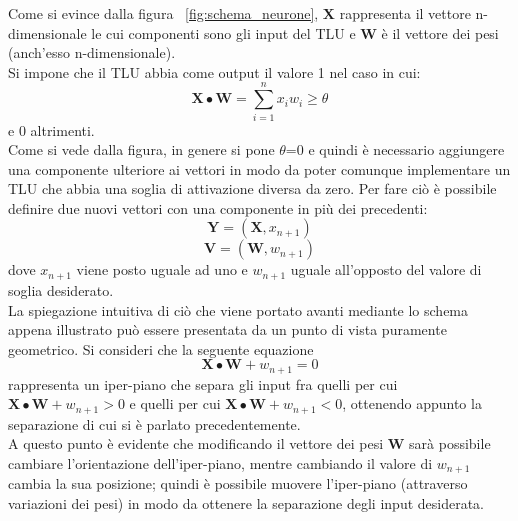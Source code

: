 Come si evince dalla figura ~\ref{fig:schema_neurone}, $\textbf{X}$ rappresenta il vettore n-dimensionale le cui componenti sono gli input del TLU e $\textbf{W}$ è il vettore dei pesi (anch'esso n-dimensionale). \\
Si impone che il TLU abbia come output il valore 1 nel caso in cui:
\begin{equation}
\textbf{X}\bullet\textbf{W} = \sum_{i=1}^{n} x_iw_i \ge \theta
\end{equation}  
e 0 altrimenti. \\
Come si vede dalla figura, in genere si pone $\theta$=0 e quindi è necessario aggiungere una componente ulteriore ai vettori in modo da poter comunque implementare un TLU che abbia una soglia di attivazione diversa da zero. Per fare ciò è possibile definire due nuovi vettori con una componente in più dei precedenti:
\begin{equation}
	\textbf{Y} = (\textbf{X},x_{n+1})
\end{equation}
\begin{equation}
	\textbf{V} = (\textbf{W},w_{n+1})
\end{equation}
dove $x_{n+1}$ viene posto uguale ad uno e $w_{n+1}$ uguale all'opposto del valore di soglia desiderato. \\
La spiegazione intuitiva di ciò che viene portato avanti mediante lo schema appena illustrato può essere presentata da un punto di vista puramente geometrico. Si consideri che la seguente equazione
\begin{equation}
	\textbf{X}\bullet\textbf{W} + w_{n+1} = 0
\end{equation}
rappresenta un iper-piano che separa gli input fra quelli per cui $\textbf{X}\bullet\textbf{W} + w_{n+1} > 0$ e quelli per cui $\textbf{X}\bullet\textbf{W} + w_{n+1} < 0$, ottenendo appunto la separazione di cui si è parlato precedentemente. \\
A questo punto è evidente che modificando il vettore dei pesi $\textbf{W}$ sarà possibile cambiare l'orientazione dell'iper-piano, mentre cambiando il valore di $w_{n+1}$ cambia la sua posizione; quindi è possibile muovere l'iper-piano (attraverso variazioni dei pesi) in modo da ottenere la separazione degli input desiderata.